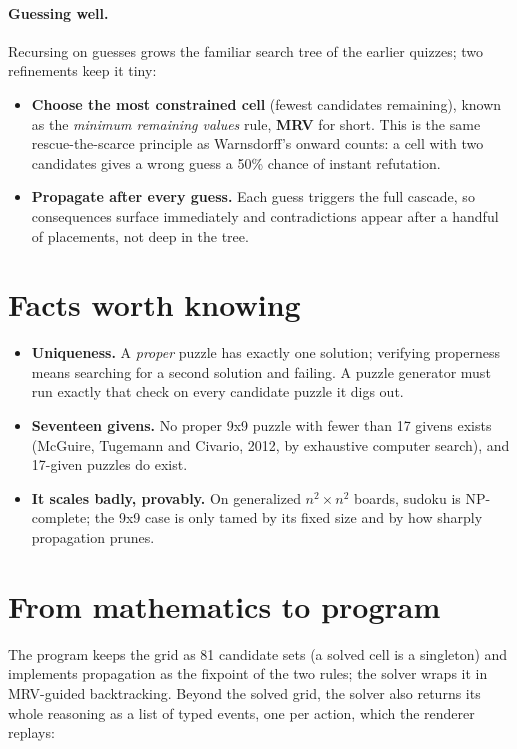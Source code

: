 \documentclass[11pt]{article}
\begin{document}
\paragraph{Guessing well.}
Recursing on guesses grows the familiar search tree of the earlier
quizzes; two refinements keep it tiny:

\begin{itemize}
  \item \textbf{Choose the most constrained cell} (fewest candidates
    remaining), known as the \emph{minimum remaining values} rule,
    \textbf{MRV} for short. This is the same rescue-the-scarce principle
    as Warnsdorff's onward counts: a cell with two candidates gives a
    wrong guess a 50\% chance of instant refutation.
  \item \textbf{Propagate after every guess.} Each guess triggers the full
    cascade, so consequences surface immediately and contradictions
    appear after a handful of placements, not deep in the tree.
\end{itemize}

\section{Facts worth knowing}

\begin{itemize}
  \item \textbf{Uniqueness.} A \emph{proper} puzzle has exactly one
    solution; verifying properness means searching for a second solution
    and failing. A puzzle generator must run exactly that check on every
    candidate puzzle it digs out.
  \item \textbf{Seventeen givens.} No proper 9x9 puzzle with fewer than 17
    givens exists (McGuire, Tugemann and Civario, 2012, by exhaustive
    computer search), and 17-given puzzles do exist.
  \item \textbf{It scales badly, provably.} On generalized
    $n^2 \times n^2$ boards, sudoku is NP-complete; the 9x9 case is only
    tamed by its fixed size and by how sharply propagation prunes.
\end{itemize}

\section{From mathematics to program}

The program keeps the grid as 81 candidate sets (a solved cell is a
singleton) and implements propagation as the fixpoint of the two rules;
the solver wraps it in MRV-guided backtracking. Beyond the solved grid,
the solver also returns its whole reasoning as a list of typed events,
one per action, which the renderer replays:
\end{document}
